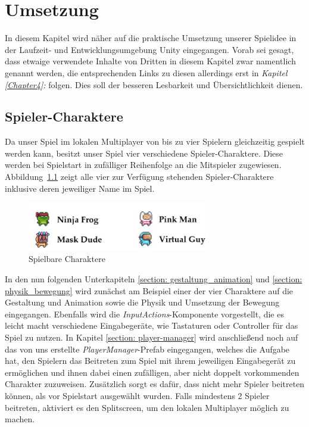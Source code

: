 \setlength{\parindent}{0em}

\chapter{Umsetzung}

\label{Chapter2}

In diesem Kapitel wird näher auf die praktische Umsetzung unserer Spielidee in der Laufzeit- und Entwicklungsumgebung Unity eingegangen. Vorab sei gesagt, dass  etwaige verwendete Inhalte von Dritten in diesem Kapitel zwar namentlich genannt werden, die entsprechenden Links zu diesen allerdings erst in \textit{Kapitel \ref{Chapter4}: } folgen. Dies soll der besseren Lesbarkeit und Übersichtlichkeit dienen.


\section{Spieler-Charaktere}

Da unser Spiel im lokalen Multiplayer von bis zu vier Spielern gleichzeitig gespielt werden kann, besitzt unser Spiel vier verschiedene Spieler-Charaktere. Diese werden bei Spielstart in zufälliger Reihenfolge an die Mitspieler zugewiesen.\\

Abbildung~\ref{fig:player-characters} zeigt alle vier zur Verfügung stehenden Spieler-Charaktere inklusive deren jeweiliger Name im Spiel.\\

\begin{figure}[th]
\centering
\includegraphics[width=80mm]{Figures/player-characters.jpg}
\decoRule
\caption[Spielbare Charaktere]{Spielbare Charaktere}
\label{fig:player-characters}
\end{figure}

In den nun folgenden Unterkapiteln  \ref{section: gestaltung_animation} und \ref{section: physik_bewegung} wird zunächst am Beispiel einer der vier Charaktere auf die Gestaltung und Animation sowie die Physik und Umsetzung der Bewegung eingegangen. Ebenfalls wird die \textit{InputActions}-Komponente vorgestellt, die es leicht macht verschiedene Eingabegeräte, wie Tastaturen oder Controller für das Spiel zu nutzen. In Kapitel \ref{section: player-manager} wird anschließend noch auf das von uns erstellte \textit{PlayerManager}-Prefab eingegangen, welches die Aufgabe hat, den Spielern das Beitreten zum Spiel mit ihrem jeweiligen Eingabegerät zu ermöglichen und ihnen dabei einen zufälligen, aber nicht doppelt vorkommenden Charakter zuzuweisen. Zusätzlich sorgt es dafür, dass nicht mehr Spieler beitreten können, als vor Spielstart ausgewählt wurden. Falls mindestens 2 Spieler beitreten, aktiviert es den Splitscreen, um den lokalen Multiplayer möglich zu machen.

